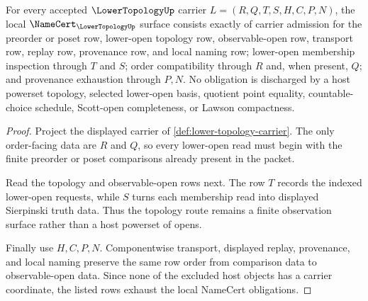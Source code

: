 \begin{theorem}
\label{thm:lower-topology-namecert-obligations}
For every accepted $\LowerTopologyUp$ carrier $L=(R,Q,T,S,H,C,P,N)$, the local $\NameCert_{\LowerTopologyUp}$ surface consists exactly of carrier admission for the preorder or poset row, lower-open topology row, observable-open row, transport row, replay row, provenance row, and local naming row; lower-open membership inspection through $T$ and $S$; order compatibility through $R$ and, when present, $Q$; and provenance exhaustion through $P,N$. No obligation is discharged by a host powerset topology, selected lower-open basis, quotient point equality, countable-choice schedule, Scott-open completeness, or Lawson compactness.
\end{theorem}
\begin{proof}
Project the displayed carrier of \autoref{def:lower-topology-carrier}. The only order-facing data are $R$ and $Q$, so every lower-open read must begin with the finite preorder or poset comparisons already present in the packet.

Read the topology and observable-open rows next. The row $T$ records the indexed lower-open requests, while $S$ turns each membership read into displayed Sierpinski truth data. Thus the topology route remains a finite observation surface rather than a host powerset of opens.

Finally use $H,C,P,N$. Componentwise transport, displayed replay, provenance, and local naming preserve the same row order from comparison data to observable-open data. Since none of the excluded host objects has a carrier coordinate, the listed rows exhaust the local NameCert obligations.
\end{proof}

